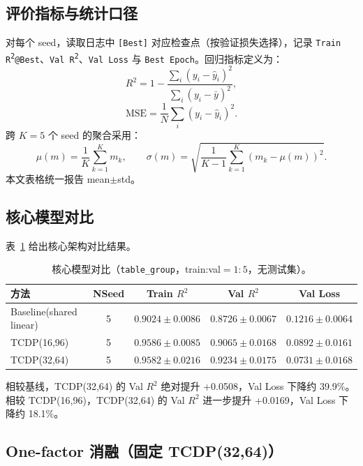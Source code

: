 ﻿\documentclass[12pt,a4paper]{ctexart}
\begin{document}
\subsection{评价指标与统计口径}

对每个 seed，读取日志中 \texttt{[Best]} 对应检查点（按验证损失选择），记录 \texttt{Train R\textsuperscript{2}@Best}、\texttt{Val R\textsuperscript{2}}、\texttt{Val Loss} 与 \texttt{Best Epoch}。回归指标定义为：
\begin{equation}
R^2 = 1-\frac{\sum_i (y_i-\hat{y}_i)^2}{\sum_i (y_i-\bar{y})^2},
\end{equation}
\begin{equation}
\mathrm{MSE} = \frac{1}{N}\sum_i (y_i-\hat{y}_i)^2.
\end{equation}
跨 $K=5$ 个 seed 的聚合采用：
\begin{equation}
\mu(m)=\frac{1}{K}\sum_{k=1}^K m_k,\qquad
\sigma(m)=\sqrt{\frac{1}{K-1}\sum_{k=1}^K (m_k-\mu(m))^2}.
\end{equation}
本文表格统一报告 mean$\pm$std。

\subsection{核心模型对比}

表~\ref{tab:core_compare_cn} 给出核心架构对比结果。

\begin{table}[htbp]
\centering
\small
\caption{核心模型对比（\texttt{table\_group}，train:val$=1:5$，无测试集）。}
\label{tab:core_compare_cn}
\begin{tabular}{lcccc}
\toprule
方法 & NSeed & Train $R^2$ & Val $R^2$ & Val Loss \\
\midrule
Baseline(shared linear) & 5 & $0.9024\pm0.0086$ & $0.8726\pm0.0067$ & $0.1216\pm0.0064$ \\
TCDP(16,96) & 5 & $0.9586\pm0.0085$ & $0.9065\pm0.0168$ & $0.0892\pm0.0161$ \\
TCDP(32,64) & 5 & $0.9582\pm0.0216$ & $\mathbf{0.9234\pm0.0175}$ & $\mathbf{0.0731\pm0.0168}$ \\
\bottomrule
\end{tabular}
\end{table}

相较基线，TCDP(32,64) 的 Val $R^2$ 绝对提升 +0.0508，Val Loss 下降约 39.9\%。相较 TCDP(16,96)，TCDP(32,64) 的 Val $R^2$ 进一步提升 +0.0169，Val Loss 下降约 18.1\%。

\subsection{One-factor 消融（固定 TCDP(32,64)）}
\end{document}
